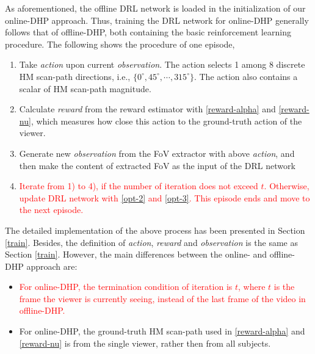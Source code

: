 \documentclass[10pt,journal,compsoc]{IEEEtran}
\begin{document}
As aforementioned, the offline DRL network is loaded in the initialization of our online-DHP approach. Thus, training the DRL network for online-DHP generally follows that of offline-DHP, both containing the basic reinforcement learning procedure.
The following shows the procedure of one episode,
\begin{enumerate}
  \item Take \textit{action} upon current \textit{observation}. The action selects 1 among 8 discrete HM scan-path directions, i.e., $\{ 0^{\circ}, 45^{\circ}, \cdots, 315^{\circ} \}$. The action also contains a scalar of HM scan-path magnitude.
  \item Calculate \textit{reward} from the reward estimator with \eqref{reward-alpha} and \eqref{reward-nu}, which measures how close this action to the ground-truth action of the viewer.
  \item Generate new \textit{observation} from the FoV extractor with above \textit{action}, and then make the content of extracted FoV as the input of the DRL network
  \item \textcolor{red}{Iterate from 1) to 4), if the number of iteration does not exceed $t$. Otherwise, update DRL network with \eqref{opt-2} and \eqref{opt-3}. This episode ends and move to the next episode.}
\end{enumerate}
The detailed implementation of the above process has been presented in Section \ref{train}.
Besides, the definition of \textit{action}, \textit{reward} and \textit{observation} is the same as Section \ref{train}.
However, the main differences between the online- and offline-DHP approach are:

\begin{itemize}
    \item \textcolor{red}{For online-DHP, the termination condition of iteration is $t$, where $t$ is the frame the viewer is currently seeing, instead of the last frame of the video in offline-DHP.}
    \item For online-DHP, the ground-truth HM scan-path used in \eqref{reward-alpha} and \eqref{reward-nu} is from the single viewer, rather then from all subjects.
\end{itemize}
\end{document}
